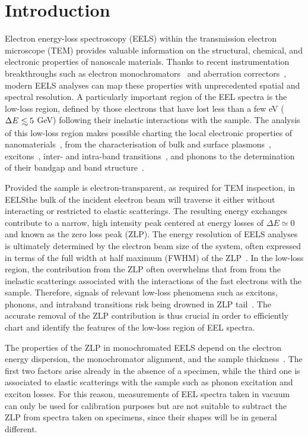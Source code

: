 \section{Introduction}
\label{sec:introduction}

Electron energy-loss spectroscopy (EELS) within the transmission electron microscope (TEM) provides
valuable information on the structural, chemical, and electronic properties of nanoscale materials.
%
Thanks to recent instrumentation breakthroughs
such as electron monochromators~\cite{Terauchi:2005, Freitag:2005} and aberration correctors~\cite{Haider:1998},
modern EELS analyses can map these properties with unprecedented spatial and spectral resolution.
%
A particularly important region of the EEL spectra is
the low-loss region, defined by those electrons that have lost
less than a few eV ($\Delta E\lsim 5$ GeV) following their inelastic interactions
with the sample.
%
The analysis of this low-loss region makes possible charting the local
electronic properties of nanomaterials~\cite{Geiger:1967}, from the characterisation of
bulk and surface plasmons~\cite{Schaffer:2008}, excitons~\cite{Erni:2005}, 
inter- and intra-band transitions~\cite{Rafferty:1998},
and phonons to the determination of their bandgap and band structure~\cite{Stoger:2008}.

Provided the sample is electron-transparent, as required for TEM inspection,
in EELSthe bulk of the incident electron beam will traverse it
either without interacting or restricted to elastic scatterings.
%
The resulting energy exchanges contribute to a narrow,
 high intensity peak centered at energy losses
of $\Delta E\simeq 0$ and known as the zero loss peak (ZLP).
%
The energy resolution of EELS analyses is ultimately determined by
the electron beam size of the system, often expressed in terms
of the full width at half maximum (FWHM) of the
ZLP~\cite{Egerton:2009}.
%
In the low-loss region, the contribution from the ZLP
often overwhelms that from 
from the inelastic scatterings associated with the interactions of the fast electrons
with the sample.
%
Therefore, signals of relevant low-loss phenomena such as excitons,
phonons, and intraband transitions risk being drowned
in ZLP tail~\cite{Abajo:2010}.
%
The accurate removal of the ZLP
contribution is thus crucial  in order to efficiently chart and identify the  features
of the low-loss  region of EEL spectra. 

The properties of the ZLP in monochromated EELS depend on the electron energy dispersion,
the monochromator alignment, and the sample thickness~\cite{Park:2008, Stoger:2008}.
%
The first two factors arise already in the absence of a specimen, while the third one is associated
to elastic scatterings with the sample such as  phonon excitation and exciton losses.
%
For this reason, measurements of EEL spectra taken in vacuum can only be used for calibration purposes
but are not suitable
to subtract the ZLP from spectra taken on specimens, since their shapes will be in general
different.

